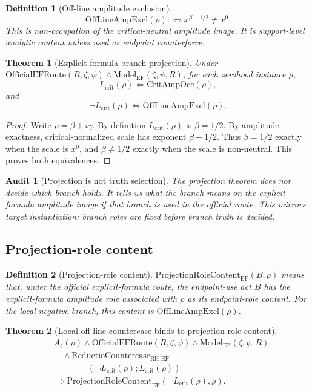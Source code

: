 \documentclass[11pt]{article}
\newtheorem{definition}{Definition}[section]
\newtheorem{theorem}{Theorem}[section]
\newtheorem{audit}{Audit}[section]
\newcommand{\Az}{A_{\zeta}}
\newcommand{\Lcrit}{L_{\mathrm{crit}}}
\newcommand{\RH}{\mathrm{RH}}
\newcommand{\EF}{\mathrm{EF}}
\newcommand{\ModelEF}{\mathrm{Model}_{\mathrm{EF}}}
\newcommand{\OfficialEFRoute}{\mathrm{OfficialEFRoute}}
\newcommand{\CritAmpOcc}{\mathrm{CritAmpOcc}}
\newcommand{\OffAmpExcl}{\mathrm{OffLineAmpExcl}}
\newcommand{\ProjRoleEF}{\mathrm{ProjectionRoleContent}_{\mathrm{EF}}}
\begin{document}
\begin{definition}[Off-line amplitude exclusion]
\[
\OffAmpExcl(\rho):\Longleftrightarrow x^{\beta-1/2}\ne x^0.
\]
This is non-occupation of the critical-neutral amplitude image.  It is support-level analytic content unless used as endpoint counterforce.
\end{definition}

\begin{theorem}[Explicit-formula branch projection]
Under \(\OfficialEFRoute(R,\zeta,\psi)\wedge \ModelEF(\zeta,\psi,R)\), for each zerohood instance \(\rho\),
\[
\Lcrit(\rho)\Longleftrightarrow \CritAmpOcc(\rho),
\]
and
\[
\neg\Lcrit(\rho)\Longleftrightarrow \OffAmpExcl(\rho).
\]
\end{theorem}

\begin{proof}
Write \(\rho=\beta+i\gamma\).  By definition \(\Lcrit(\rho)\) is \(\beta=1/2\).  By amplitude exactness, critical-normalized scale has exponent \(\beta-1/2\).  Thus \(\beta=1/2\) exactly when the scale is \(x^0\), and \(\beta\ne 1/2\) exactly when the scale is non-neutral.  This proves both equivalences.
\end{proof}

\begin{audit}[Projection is not truth selection]
The projection theorem does not decide which branch holds.  It tells us what the branch means on the explicit-formula amplitude image if that branch is used in the official route.  This mirrors target instantiation: branch roles are fixed before branch truth is decided.
\end{audit}

\subsection{Projection-role content}

\begin{definition}[Projection-role content]
\(\ProjRoleEF(B,\rho)\) means that, under the official explicit-formula route, the endpoint-use act \(B\) has the explicit-formula amplitude role associated with \(\rho\) as its endpoint-role content.  For the local negative branch, this content is \(\OffAmpExcl(\rho)\).
\end{definition}

\begin{theorem}[Local off-line countercase binds to projection-role content]
\[
\begin{aligned}
&\Az(\rho)\wedge \OfficialEFRoute(R,\zeta,\psi)\wedge \ModelEF(\zeta,\psi,R)\\
&\quad\wedge \mathrm{ReductioCountercase}_{\RH\text{-}\EF}\\
&\qquad\qquad(\neg\Lcrit(\rho);\Lcrit(\rho))\\
&\Rightarrow \ProjRoleEF(\neg\Lcrit(\rho),\rho).
\end{aligned}
\]
\end{theorem}
\end{document}
